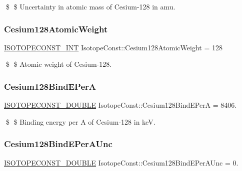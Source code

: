 \$ \$ Uncertainty in atomic mass of Cesium-\/128 in amu. \mbox{\label{group___isotope_const-_cesium-_cs128_ga55d376d4e5286ee782339b2e626b74a1}} 
\subsubsection{\texorpdfstring{Cesium128\+Atomic\+Weight}{Cesium128AtomicWeight}}
{\footnotesize\ttfamily \mbox{\hyperlink{group___isotope_const-_macros_ga5f18360b3e99483a35c32d789e62621c}{I\+S\+O\+T\+O\+P\+E\+C\+O\+N\+S\+T\+\_\+\+I\+NT}} Isotope\+Const\+::\+Cesium128\+Atomic\+Weight = 128}

\$ \$ Atomic weight of Cesium-\/128. \mbox{\label{group___isotope_const-_cesium-_cs128_gabd787ada9d1c5a1735d21d75629e7a31}} 
\subsubsection{\texorpdfstring{Cesium128\+Bind\+E\+PerA}{Cesium128BindEPerA}}
{\footnotesize\ttfamily \mbox{\hyperlink{group___isotope_const-_macros_ga8f45a7272ce02c0b4c65c44636ed719a}{I\+S\+O\+T\+O\+P\+E\+C\+O\+N\+S\+T\+\_\+\+D\+O\+U\+B\+LE}} Isotope\+Const\+::\+Cesium128\+Bind\+E\+PerA = 8406.}

\$ \$ Binding energy per A of Cesium-\/128 in keV. \mbox{\label{group___isotope_const-_cesium-_cs128_gadbe6fb23dfe460bbf30d5bd1f2c464df}} 
\subsubsection{\texorpdfstring{Cesium128\+Bind\+E\+Per\+A\+Unc}{Cesium128BindEPerAUnc}}
{\footnotesize\ttfamily \mbox{\hyperlink{group___isotope_const-_macros_ga8f45a7272ce02c0b4c65c44636ed719a}{I\+S\+O\+T\+O\+P\+E\+C\+O\+N\+S\+T\+\_\+\+D\+O\+U\+B\+LE}} Isotope\+Const\+::\+Cesium128\+Bind\+E\+Per\+A\+Unc = 0.}

